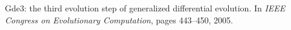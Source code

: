 \documentclass{article}
\begin{document}



{}


\newblock Gde3: the third evolution step of generalized differential evolution.
\newblock In {\em IEEE Congress on Evolutionary Computation}, pages 443--450,
  2005.

\end{document}
